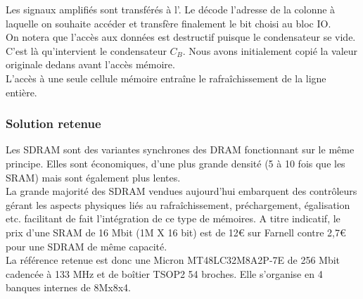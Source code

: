 \begin{itemize}
	      Les signaux amplifiés sont transférés à l'. 
	      Le  décode l'adresse de la colonne à laquelle on souhaite accéder et transfère finalement le bit choisi au bloc IO. \\
	      On notera que l'accès aux données est destructif puisque le condensateur se vide.
	      C'est là qu'intervient le condensateur \(C_B\).
	      Nous avons initialement copié la valeur originale dedans avant l'accès mémoire. \\
	      L'accès à une seule cellule mémoire entraîne le rafraîchissement de la ligne entière. \\
\end{itemize}
\subsubsection{Solution retenue}
Les SDRAM sont des variantes synchrones des DRAM fonctionnant sur le même principe.
Elles sont économiques, d'une plus grande densité (5 à 10 fois que les SRAM) mais sont également plus lentes. \\
La grande majorité des SDRAM vendues aujourd'hui embarquent des contrôleurs gérant les aspects physiques liés au rafraîchissement, préchargement, égalisation etc. facilitant de fait l'intégration de ce type de mémoires. 
A titre indicatif, le prix d'une SRAM de 16 Mbit (1M X 16 bit) est de 12€ sur Farnell contre 2,7€ pour une SDRAM de même capacité. \\
La référence retenue est donc une Micron MT48LC32M8A2P-7E \autocite{micron:MT48LC32M8A2P7E} de 256 Mbit cadencée à 133 MHz et de boîtier TSOP2 54 broches. Elle s'organise en 4 banques internes de 8Mx8x4.\\        	
    
